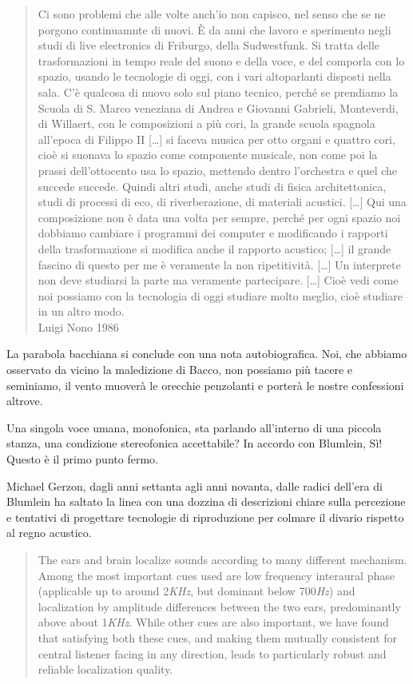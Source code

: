 \begin{quote}
Ci sono problemi che alle volte anch'io non capisco, nel senso che se ne porgono
continuamnte di nuovi. È da anni che lavoro e sperimento negli studi di live electronics di
Friburgo, della Sudwestfunk. Si tratta delle trasformazioni in tempo reale del
suono e della voce, e del comporla con lo spazio, usando le tecnologie di oggi,
con i vari altoparlanti disposti nella sala. C'è qualcosa di nuovo solo sul piano
tecnico, perché  se prendiamo la Scuola di S. Marco veneziana di Andrea e Giovanni
Gabrieli, Monteverdi, di Willaert, con le composizioni a più cori, la grande
scuola spagnola all'epoca di Filippo II [\ldots] si faceva musica per otto organi
e quattro cori, cioè si suonava lo spazio come componente musicale, non come poi
la prassi dell'ottocento usa lo spazio, mettendo dentro l'orchestra e quel che
succede succede. Quindi altri studi, anche studi di fisica architettonica, studi
di processi di eco, di riverberazione, di materiali acustici. [\ldots] Qui una
composizione non è  data una volta per sempre, perché per ogni spazio noi dobbiamo
cambiare i programmi dei computer e modificando i rapporti della trasformazione si modifica anche il rapporto acustico; [\ldots] il grande fascino di questo per me
è veramente la non ripetitività. [\ldots] Un interprete non deve studiarsi la
parte ma veramente partecipare. [\ldots] Cioè vedi come noi possiamo con la
tecnologia di oggi studiare molto meglio, cioè studiare in un altro modo. \\
Luigi Nono 1986
\end{quote}

La parabola bacchiana si conclude con una nota autobiografica. Noi, che abbiamo
osservato da vicino la maledizione di Bacco, non possiamo più tacere e seminiamo,
il vento muoverà le orecchie penzolanti e porterà le nostre confessioni altrove.

Una singola voce umana, monofonica, sta parlando all'interno di una piccola
stanza, una condizione stereofonica accettabile? In accordo con Blumlein,
Sì! Questo è il primo punto fermo.

Michael Gerzon, dagli anni settanta agli anni novanta, dalle radici dell'era di
Blumlein ha saltato la linea con una dozzina di descrizioni chiare sulla
percezione e tentativi di progettare tecnologie di riproduzione per colmare il
divario rispetto al regno acustico.

\begin{quotation}
The ears and brain localize sounds according to many different mechanism. Among
the most important cues used are low frequency interaural phase (applicable up
to around 2\emph{KHz}, but dominant below 700\emph{Hz}) and localization by
amplitude differences between the two ears, predominantly above about
1\emph{KHz}. While other cues are also important, we have found that satisfying
both these cues, and making them mutually consistent for central listener facing
in any direction, leads to particularly robust and reliable localization
quality.\cite{mg92pdmsss}
\end{quotation}

